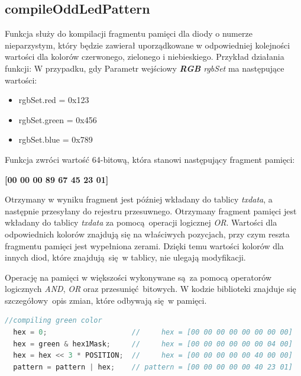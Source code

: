\documentclass[eng,printmode]{mgr}
\begin{document}
\subsection{compileOddLedPattern} 

Funkcja służy do kompilacji fragmentu pamięci dla diody o numerze nieparzystym, który będzie zawierał uporządkowane w odpowiedniej kolejności wartości dla kolorów czerwonego, zielonego i niebieskiego.
Przykład działania funkcji:
W przypadku, gdy Parametr wejściowy \emph{\textbf{RGB} rgbSet} ma następujące wartości:

\begin{itemize}
  \item{rgbSet.red   = 0x123}
  \item{rgbSet.green = 0x456}
  \item{rgbSet.blue  = 0x789}
\end{itemize}
             
Funkcja zwróci wartość 64-bitową, która stanowi następujący fragment pamięci:

\vspace{0.3cm}
\hspace{0.3cm} \textbf{[00 00 00 89 67 45 23 01]}
\vspace{0.3cm}

Otrzymany w wyniku fragment jest później wkładany do tablicy \emph{txdata}, a następnie przesyłany do rejestru przesuwnego. Otrzymany fragment pamięci jest wkładany do tablicy \emph{txdata} za pomocą operacji logicznej \emph{OR}. Wartości dla odpowiednich kolorów znajdują się na właściwych pozycjach, przy czym reszta fragmentu pamięci jest wypełniona zerami. Dzięki temu wartości kolorów dla innych diod, które znajdują się w tablicy, nie ulegają modyfikacji.

Operację na pamięci w większości wykonywane są za pomocą operatorów logicznych \emph{AND}, \emph{OR} oraz przesunięć bitowych. W kodzie biblioteki znajduje się szczegółowy opis zmian, które odbywają się w pamięci.

\vspace{0.3cm}
\begin{lstlisting}[language=c,frame=single,caption={Fragment kodu, w którym przedstawiony jest komentarz ilustrujący efekt wykonywania operacji na pamięci}]
  //compiling green color     
  hex = 0;                    //     hex = [00 00 00 00 00 00 00 00]
  hex = green & hex1Mask;     //     hex = [00 00 00 00 00 00 04 00]
  hex = hex << 3 * POSITION;  //     hex = [00 00 00 00 00 40 00 00]
  pattern = pattern | hex;    // pattern = [00 00 00 00 00 40 23 01]

\end{lstlisting}
\end{document}
